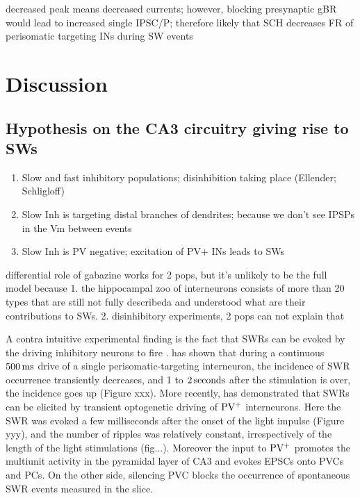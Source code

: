     decreased peak means decreased currents; however, blocking presynaptic gBR would lead to increased single IPSC/P; therefore likely that SCH decreases FR of perisomatic targeting INs during SW events

\section{Discussion}
  \subsection{Hypothesis on the CA3 circuitry giving rise to SWs}

    \begin{enumerate}
      \item Slow and fast inhibitory populations; disinhibition taking place (Ellender; Schligloff)
      \item Slow Inh is targeting distal branches of dendrites; because we don't see IPSPs in the Vm between events
      \item Slow Inh is PV negative; excitation of PV+ INs leads to SWs
    \end{enumerate}

    differential role of gabazine works for 2 pops, but it's unlikely to be the full model
    because 1. the hippocampal zoo of interneurons consists of more than 20 types that are still not 
    fully describeda and understood what are their contributions to SWs.
    2. disinhibitory experiments, 2 pops can not explain that 

    A contra intuitive experimental finding is the fact that SWRs can be evoked
    by the driving inhibitory neurons to fire \citep{Ellender2010,
    Schlingloff2014}. \citep{Ellender2010} has shown that during a continuous
    $500\, \rm ms$ drive of a single perisomatic-targeting interneuron, the
    incidence of SWR occurrence transiently decreases, and 1 to $2\,\rm
    seconds$ after the stimulation is over, the incidence goes up (Figure xxx).
    More recently, \citep{Schlingloff2014} has demonstrated that SWRs can be
    elicited by transient optogenetic driving of $\rm PV^+$ interneurons. Here
    the SWR was evoked a few milliseconds after the onset of the light impulse
    (Figure yyy), and the number of ripples was relatively constant,
    irrespectively of the length of the light stimulations (fig...). Moreover
    the input to $\rm PV^+$ promotes the multiunit activity in the pyramidal
    layer of CA3 and evokes EPSCs onto PVCs and PCs.  On the other side,
    silencing PVC blocks the occurrence of spontaneous SWR events measured in
    the slice.

